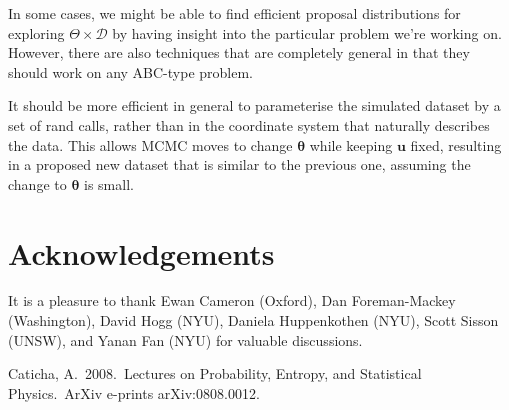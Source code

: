 \documentclass[a4paper, 11pt]{article}
\newcommand{\params}{\boldsymbol{\theta}}	%
\newcommand{\rands}{\boldsymbol{u}}
\begin{document}
In some cases, we might be able to find efficient proposal distributions for exploring $\Theta \times \mathcal{D}$ by having insight into the particular
problem we're working on. However, there are also techniques that are
completely general in that they should work on any ABC-type problem.

It should be more efficient in general to parameterise the simulated dataset
by a set of rand calls, rather than in the coordinate system that naturally
describes the data. This allows MCMC moves to change $\params$ while keeping
$\rands$ fixed, resulting in a proposed new dataset that is similar to the
previous one, assuming the change to $\params$ is small.

\section*{Acknowledgements}
It is a pleasure to thank Ewan Cameron (Oxford), Dan
Foreman-Mackey (Washington), David Hogg (NYU), Daniela Huppenkothen (NYU),
Scott Sisson (UNSW), and Yanan Fan (NYU) for valuable discussions.

\begin{thebibliography}{99}
 Caticha, A.\ 2008.\ Lectures 
on Probability, Entropy, and Statistical Physics.\ ArXiv e-prints 
arXiv:0808.0012. 

\end{thebibliography}
\end{document}
